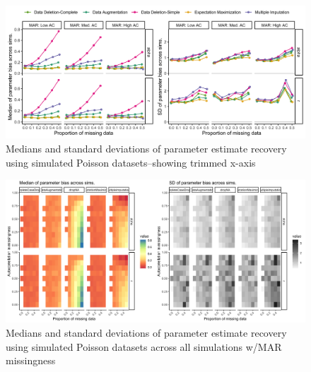 \documentclass{article}
\begin{document}
\begin{figure}
    \noindent\includegraphics[width = \textwidth]{Figures/parameterRecovery_sim_Poisson_medsSD_trimmed.png}
    \caption{Medians and standard deviations of parameter estimate recovery using simulated Poisson datasets--showing trimmed x-axis}
    \label{fig:ParamRec_Poiss}
\end{figure}

\begin{figure}
    \noindent\includegraphics[width = \textwidth]{Figures/heatmap_PoissonMAR_all.png}
    \caption{Medians and standard deviations of parameter estimate recovery using simulated Poisson datasets across all simulations w/MAR missingness}
    \label{fig:heatMap_poiss_MAR}
\end{figure}
\end{document}
